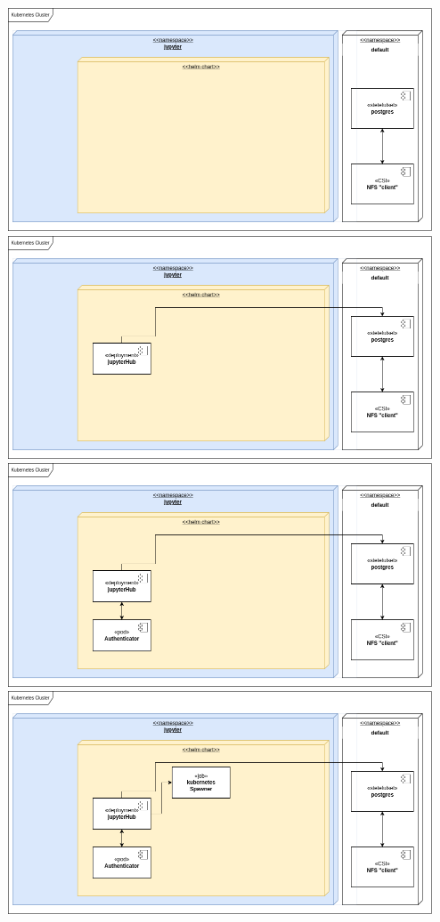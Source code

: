 \documentclass[10pt,brazil]{beamer}
\theoremstyle{definition}
\begin{document}
\begin{frame}[plain]
\begin{figure}
\begin{center}
\begin{overprint}
      \includegraphics[width=1\textwidth]{deploy-jupy-4.png}
      \includegraphics[width=1\textwidth]{deploy-jupy-5.png}
      \includegraphics[width=1\textwidth]{deploy-jupy-6.png}
      \includegraphics[width=1\textwidth]{deploy-jupy-7.png}

\end{overprint}
\end{center}
\end{figure}
\end{frame}
\end{document}
